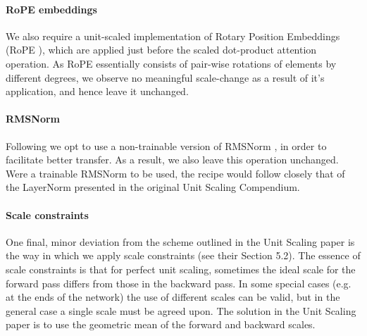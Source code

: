 \paragraph{RoPE embeddings}

We also require a unit-scaled implementation of Rotary Position Embeddings (RoPE \citep{RoPE}), which are applied just before the scaled dot-product attention operation. As RoPE essentially consists of pair-wise rotations of elements by different degrees, we observe no meaningful scale-change as a result of it's application, and hence leave it unchanged.

\paragraph{RMSNorm}

Following \citep{Exploration_Of_Mu_Transfer} we opt to use a non-trainable version of RMSNorm \citep{RMS_Norm}, in order to facilitate better transfer. As a result, we also leave this operation unchanged. Were a trainable RMSNorm to be used, the recipe would follow closely that of the LayerNorm presented in the original Unit Scaling Compendium.

\paragraph{Scale constraints}

One final, minor deviation from the scheme outlined in the Unit Scaling paper is the way in which we apply scale constraints (see their Section 5.2). The essence of scale constraints is that for perfect unit scaling, sometimes the ideal scale for the forward pass differs from those in the backward pass. In some special cases (e.g. at the ends of the network) the use of different scales can be valid, but in the general case a single scale must be agreed upon. The solution in the Unit Scaling paper is to use the geometric mean of the forward and backward scales.

